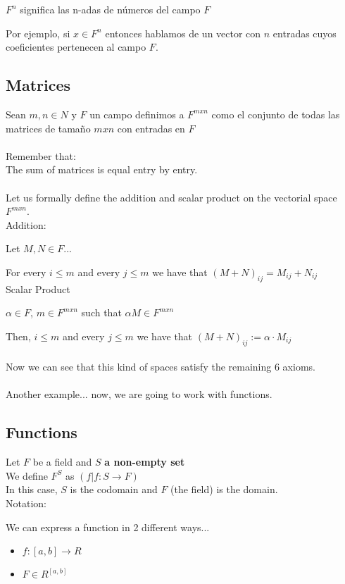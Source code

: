 \documentclass{article}
\begin{document}
\(F^n\) significa las n-adas de números del campo \(F\)

Por ejemplo, si \(x \in F^n\) entonces hablamos de un vector con \(n\) entradas cuyos coeficientes pertenecen al campo \(F\).
\\
\subsection*{Matrices}
Sean \(m,n \in N\) y \(F\) un campo definimos a \(F^{mxn}\) como el conjunto de todas las matrices de tamaño \(m x n\) con entradas en \(F\)
\\
\\
Remember that:
\\
The sum of matrices is equal entry by entry.
\\
\\
Let us formally define the addition and scalar product on the vectorial space \(F^{mxn}\).
\\

Addition:

Let \(M, N \in F\)...

For every \(i \leq m\) and every \(j \leq m\) we have that \((M + N)_{ij} = M_{ij} + N_{ij}\)
\\

Scalar Product

\(\alpha \in F\), \(m \in F^{mxn}\) such that \(\alpha M \in F^{mxn}\)

Then, \(i \leq m\) and every \(j \leq m\) we have that \((M + N)_{ij} := \alpha \cdot M_{ij}\)
\\
\\
Now we can see that this kind of spaces satisfy the remaining 6 axioms.
\\
\\
Another example... now, we are going to work with functions.

\subsection*{Functions}
Let \(F\) be a field and \(S\) \textbf{a non-empty set}
\\
We define \(F^S\) as \((f | f: S \rightarrow F)\)
\\
In this case, \(S\) is the codomain and \(F\) (the field) is the domain.
\\

Notation:

We can express a function in 2 different ways...
\begin{itemize}
    \item \(f : [a,b] \rightarrow R\)
    \item \(F \in R^{[a,b]}\)
\end{itemize}
\end{document}
